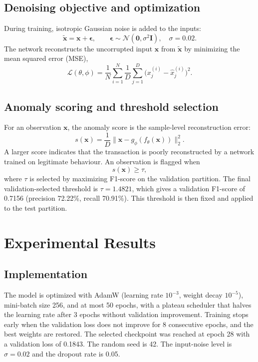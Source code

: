 \documentclass[conference]{IEEEtran}
\begin{document}
\subsection{Denoising objective and optimization}
During training, isotropic Gaussian noise is added to the inputs:
\begin{equation}
\tilde{\mathbf{x}}=\mathbf{x}+\boldsymbol{\epsilon},\qquad \boldsymbol{\epsilon}\sim\mathcal{N}(\mathbf{0},\sigma^{2}\mathbf{I}),\quad \sigma=0.02.
\end{equation}
The network reconstructs the uncorrupted input $\mathbf{x}$ from $\tilde{\mathbf{x}}$ by minimizing the mean squared error (MSE),
\begin{equation}
\mathcal{L}(\theta,\phi)=\frac{1}{N}\sum_{i=1}^{N}\frac{1}{D}\sum_{j=1}^{D}\bigl(x_j^{(i)}-\hat{x}_j^{(i)}\bigr)^{2}.
\label{eq:loss}
\end{equation}

\subsection{Anomaly scoring and threshold selection}
For an observation $\mathbf{x}$, the anomaly score is the sample-level reconstruction error:
\begin{equation}
s(\mathbf{x})=\frac{1}{D}\bigl\lVert\mathbf{x}-g_\phi(f_\theta(\mathbf{x}))\bigr\rVert_2^{2}.
\label{eq:score}
\end{equation}
A larger score indicates that the transaction is poorly reconstructed by a network trained on legitimate behaviour. An observation is flagged when
\begin{equation}
s(\mathbf{x})\geq\tau,
\end{equation}
where $\tau$ is selected by maximizing F1-score on the validation partition. The final validation-selected threshold is $\tau=1.4821$, which gives a validation F1-score of 0.7156 (precision 72.22\%, recall 70.91\%). This threshold is then fixed and applied to the test partition.

\section{Experimental Results}
\subsection{Implementation}
The model is optimized with AdamW (learning rate $10^{-3}$, weight decay $10^{-5}$), mini-batch size 256, and at most 50 epochs, with a plateau scheduler that halves the learning rate after 3 epochs without validation improvement. Training stops early when the validation loss does not improve for 8 consecutive epochs, and the best weights are restored. The selected checkpoint was reached at epoch 28 with a validation loss of 0.1843. The random seed is 42. The input-noise level is $\sigma=0.02$ and the dropout rate is 0.05.
\end{document}
